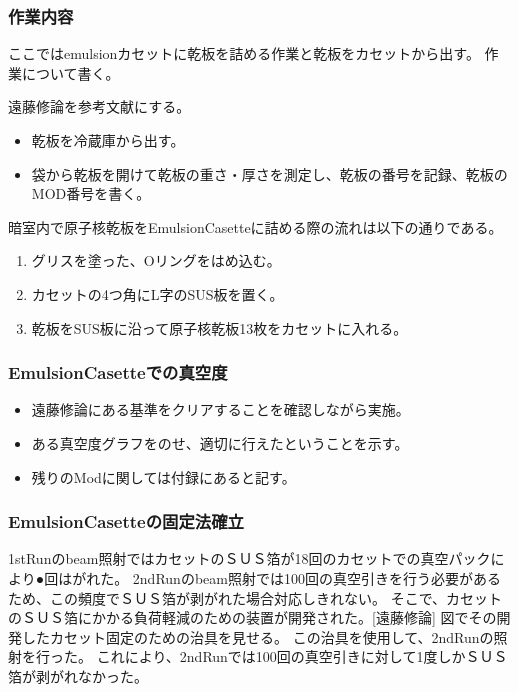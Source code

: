 \documentclass[12pt,a4paper]{jarticle}
\begin{document}
\subsubsection{作業内容}
ここではemulsionカセットに乾板を詰める作業と乾板をカセットから出す。
作業について書く。
\par
遠藤修論を参考文献にする。
\begin{itemize}
 \item 乾板を冷蔵庫から出す。
 \item 袋から乾板を開けて乾板の重さ・厚さを測定し、乾板の番号を記録、乾板のMOD番号を書く。
\end{itemize}
暗室内で原子核乾板をEmulsionCasetteに詰める際の流れは以下の通りである。
\begin{enumerate}
    \item グリスを塗った、Oリングをはめ込む。
    \item カセットの4つ角にL字のSUS板を置く。 
    \item 乾板をSUS板に沿って原子核乾板13枚をカセットに入れる。
\end{enumerate}
\subsubsection{EmulsionCasetteでの真空度}
\begin{itemize}
 \item 遠藤修論にある基準をクリアすることを確認しながら実施。
 \item ある真空度グラフをのせ、適切に行えたということを示す。
 \item 残りのModに関しては付録にあると記す。
\end{itemize}
\subsubsection{EmulsionCasetteの固定法確立}
1stRunのbeam照射ではカセットのＳＵＳ箔が18回のカセットでの真空パックにより●回はがれた。
2ndRunのbeam照射では100回の真空引きを行う必要があるため、この頻度でＳＵＳ箔が剥がれた場合対応しきれない。
そこで、カセットのＳＵＳ箔にかかる負荷軽減のための装置が開発された。[遠藤修論]
図でその開発したカセット固定のための治具を見せる。
この治具を使用して、2ndRunの照射を行った。
これにより、2ndRunでは100回の真空引きに対して1度しかＳＵＳ箔が剥がれなかった。
\end{document}
